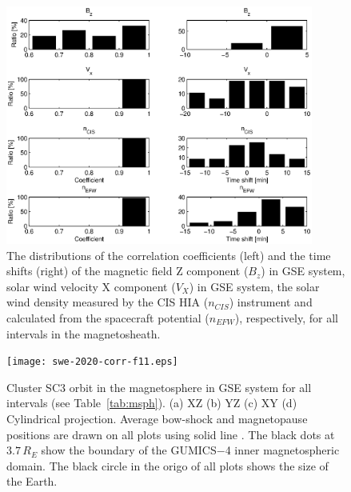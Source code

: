 \documentclass[linenumbers,draft]{agujournal}
\begin{document}
\begin{figure}[h]
\centering
\includegraphics[width=0.9\textwidth,angle=0]{swe-2020-corr-f10.eps}  
\caption{The distributions of the correlation coefficients (left) and the time shifts (right) of the magnetic field Z component ($B_z$) in GSE system, solar wind velocity X component ($V_X$) in GSE system, the solar wind density measured by the CIS HIA ($n_{CIS}$) instrument and calculated from the spacecraft potential ($n_{EFW}$), respectively, for all intervals in the magnetosheath.}
\label{fig:mshcorrplot}
\end{figure}

\pagebreak

\begin{figure}[h]
\centering
\texttt{[image: swe-2020-corr-f11.eps]}  
\caption{Cluster SC3 orbit in the magnetosphere in GSE system for all intervals (see Table~\ref{tab:msph}). (a) XZ (b) YZ (c) XY (d) Cylindrical projection. Average bow-shock and magnetopause positions are drawn on all plots using solid line \citep[][respectively]{peredo95:_three_alfven_mach,tsyganenko95:_model_earth}. The black dots at $3.7\,R_E$ show the boundary of the GUMICS$-$4 inner magnetospheric domain. The black circle in the origo of all plots shows the size of the Earth.}
\label{fig:msphorbit}
\end{figure}

\pagebreak
\end{document}

